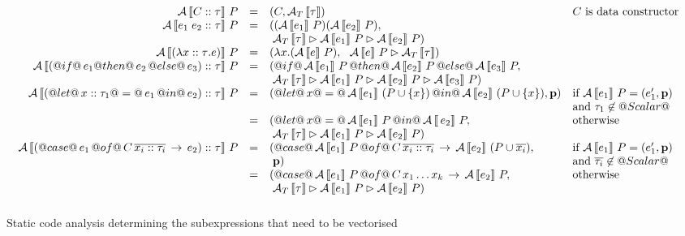 \begin{figure*}
$$\begin{array}{c}
\begin{array}{rcll}
%
\AV{C::\tau}{P}            & = & (C, \AT{\tau})    & \mbox{$C$ is data constructor} \\
%
\AV{e_1 \; e_2 :: \tau}{P} & = & ((\AV{e_1}{P})(\AV{e_2}{P}), \\
                           &   & \;\AT{\tau} \orp \AV{e_1}{P} \orp \AV{e_2}{P})\\
%
   \AV{(\lambda{x:: \tau}.e)}{P} & = & (\lambda{x}. (\AV{e}{P})  , ~~ \AV{e}{P} \orp \AT{\tau}) \\
%                                  
\AV{(@if@\,e_1  @then@ \,e_2\, @else@ \, e_3) :: \tau}{P} 
    & = & ( @if@\, \AV{e_1}{P} \, @then@ \,\AV{e_2}{P} \, @else@ \, \AV{e_3}{P}, \\
    &   & \;\AT{\tau} \orp \AV{e_1}{P} \orp \AV{e_2}{P} \orp \AV{e_3}{P})\\
%       
\AV{(@let@\, x:: \tau_1   @=@ \,e_1\,  @in@ \,e_2) :: \tau}{P} 
  & =  & (@let@\, x  @=@ \,\AV{e_1}{(P \cup \{x\})} \, @in@\, \AV{e_2}{(P \cup \{x\})}, \AVP) 
       & \mbox{if $\AV{e_1}{P} = (e_1', \AVP)$} \\
  &&   & \mbox{and $\tau_1 \not\in @Scalar@$}\\
%
  & = & (@let@\, x  @=@ \,\AV{e_1}{P} \, @in@\, \AV{\,e_2}{P}, & \mbox{otherwise}\\
  && \;{\AT{\tau} \orp \AV{e_1}{P} \orp \AV{e_2}{P}}) \\
\AV{(@case@\,e_1 \, @of@ \,C\,\tup{x_i ::\tau_i} \, \rightarrow \,e_2) :: \tau}{P} 
  & =& (@case@\, \AV{e_1}{P} \, @of@ \,C\,\tup{x_i ::\tau_i}\, \rightarrow \,\AV{e_2}{(P\cup \tup{x_i})}, &\mbox{if $\AV{e_1}{P} = (e_1', \AVP)$}\\
 &&   \; \AVP)                    & \mbox{and $\tup{\tau_i} \not\in @Scalar@$}\\
%
  & =& (@case@\, \AV{e_1}{P} \, @of@ \,C\,x_1 \ldots x_k \, \rightarrow \,\AV{e_2}{P},& \mbox{otherwise} \\
 &&\; \AT{\tau} \orp \AV{e_1}{P} \orp \AV{e_2}{P})   \\ 
\end{array} \\ \\[-2mm]
\end{array}$$
\caption{Static code analysis determining the subexpressions that need to be vectorised}
\label{fig:labeling}
\end{figure*}
